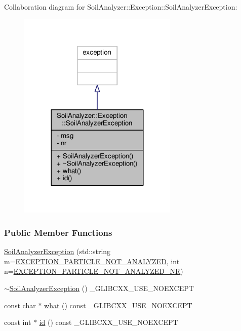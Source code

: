 Collaboration diagram for Soil\+Analyzer\+:\+:Exception\+:\+:Soil\+Analyzer\+Exception\+:
\nopagebreak
\begin{figure}[H]
\begin{center}
\leavevmode
\includegraphics[width=216pt]{class_soil_analyzer_1_1_exception_1_1_soil_analyzer_exception__coll__graph}
\end{center}
\end{figure}
\subsubsection*{Public Member Functions}
\begin{DoxyCompactItemize}
\item 
\hyperlink{class_soil_analyzer_1_1_exception_1_1_soil_analyzer_exception_a6d8ef795b58b1f67eb142dfe8ee57050}{Soil\+Analyzer\+Exception} (std\+::string m=\hyperlink{soilanalyzerexception_8h_ab5a65c5a9faf5f47deb0392d3ce844e8}{E\+X\+C\+E\+P\+T\+I\+O\+N\+\_\+\+P\+A\+R\+T\+I\+C\+L\+E\+\_\+\+N\+O\+T\+\_\+\+A\+N\+A\+L\+Y\+Z\+E\+D}, int n=\hyperlink{soilanalyzerexception_8h_a0dd1d83fbad6ddcd1f33b4ad1b8df6d7}{E\+X\+C\+E\+P\+T\+I\+O\+N\+\_\+\+P\+A\+R\+T\+I\+C\+L\+E\+\_\+\+N\+O\+T\+\_\+\+A\+N\+A\+L\+Y\+Z\+E\+D\+\_\+\+N\+R})
\item 
\hyperlink{class_soil_analyzer_1_1_exception_1_1_soil_analyzer_exception_a243bc97c66f92364157aaf7b92306817}{$\sim$\+Soil\+Analyzer\+Exception} () \+\_\+\+G\+L\+I\+B\+C\+X\+X\+\_\+\+U\+S\+E\+\_\+\+N\+O\+E\+X\+C\+E\+P\+T
\item 
const char $\ast$ \hyperlink{class_soil_analyzer_1_1_exception_1_1_soil_analyzer_exception_a6bcafc910ec0d5eb97052f0e94e642aa}{what} () const \+\_\+\+G\+L\+I\+B\+C\+X\+X\+\_\+\+U\+S\+E\+\_\+\+N\+O\+E\+X\+C\+E\+P\+T
\item 
const int $\ast$ \hyperlink{class_soil_analyzer_1_1_exception_1_1_soil_analyzer_exception_a7cf48c7c8e400fe2c8789a78b9d9ad7b}{id} () const \+\_\+\+G\+L\+I\+B\+C\+X\+X\+\_\+\+U\+S\+E\+\_\+\+N\+O\+E\+X\+C\+E\+P\+T
\end{DoxyCompactItemize}
